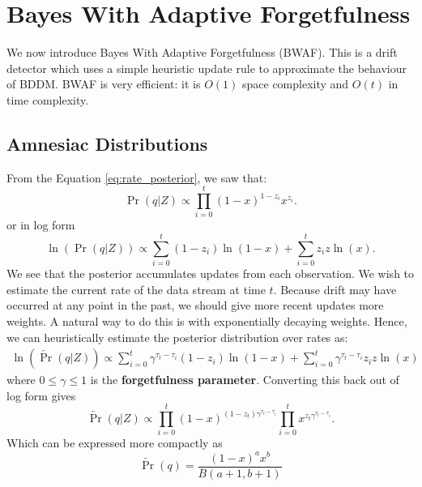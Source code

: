 \section{Bayes With Adaptive Forgetfulness} \label{BDD:BWAF}

We now introduce Bayes With Adaptive Forgetfulness (BWAF). This is a drift detector which uses a simple heuristic update rule to approximate the behaviour of BDDM. BWAF is very efficient: it is $O(1)$ space complexity and $O(t)$ in time complexity. 

\subsection{Amnesiac Distributions}

From the Equation \ref{eq:rate_posterior}, we saw that:
\begin{equation}
    \Pr(q|Z) \propto \prod_{i=0}^t (1-x)^{1-z_i}x^{z_i}.
\end{equation}
or in log form
\begin{equation}
    \ln\left(\Pr(q|Z)\right) \propto \sum_{i=0}^t (1-z_i)\ln(1-x) + \sum_{i=0}^t z_i z\ln(x).
\end{equation}
We see that the posterior accumulates updates from each observation. We wish to estimate the current rate of the data stream at time $t$. Because drift may have occurred at any point in the past, we should give more recent updates more weights. A natural way to do this is with exponentially decaying weights. Hence, we can heuristically estimate the posterior distribution over rates as:
\begin{align}
    \ln\left(\overleftarrow{\Pr}(q|Z)\right) \propto \sum_{i=0}^t \gamma^{\tau_t-\tau_i} (1-z_i)\ln(1-x) + \sum_{i=0}^t \gamma^{\tau_t-\tau_i} z_i z\ln(x) \label{eq:horse}
\end{align}
where $0\le\gamma\le 1$ is the {\bf forgetfulness parameter}. Converting this back out of log form gives
\begin{equation}
    \overleftarrow{\Pr}(q|Z) \propto \prod_{i=0}^t (1-x)^{(1-z_t)\gamma^{\tau_t-\tau_i}} \prod_{i=0}^t x^{z_t\gamma^{\tau_t-\tau_i}}.
\end{equation}
Which can be expressed more compactly as
\begin{equation}
    \overleftarrow{\Pr}(q) = \frac{(1-x)^a x^b}{B(a+1,b+1)} \label{eq:banana}
\end{equation}
